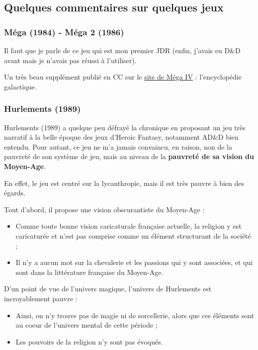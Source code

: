 \documentclass[a4paper, 11pt, twoside]{article}
\begin{document}
\subsection{Quelques commentaires sur quelques jeux}
\label{sec:orge708b2d}
\subsubsection{Méga (1984) - Méga 2 (1986)}
\label{sec:org41e31c1}
Il faut que je parle de ce jeu qui est mon premier JDR (enfin, j'avais eu D\&D avant mais je n'avais pas réussi à l'utiliser).

Un très beau supplément publié en CC sur le \href{https://www.messagers-galactiques.com}{site de Méga IV} : l'encyclopédie galactique.

\subsubsection{Hurlements (1989)}
\label{sec:orgdacab94}

Hurlements (1989) a quelque peu défrayé la chronique en proposant un jeu très narratif à la belle époque des jeux d'Heroic Fantasy, notamment AD\&D bien entendu. Pour autant, ce jeu ne m'a jamais convaincu, en raison, non de la pauvreté de son système de jeu, mais au niveau de la \textbf{pauvreté de sa vision du Moyen-Age}.

En effet, le jeu est centré sur la lycanthropie, mais il est très pauvre à bien des égards.

Tout d'abord, il propose une vision obscurantiste du Moyen-Age :
\begin{itemize}
\item Comme toute bonne vision caricaturale française actuelle, la religion y est caricaturée et n'est pas comprise comme un élément structurant de la société ;
\item Il n'y a aucun mot sur la chevalerie et les passions qui y sont associées, et qui sont dans la littérature française du Moyen-Age.
\end{itemize}

D'un point de vue de l'univers magique, l'univers de Hurlements est incroyablement pauvre :
\begin{itemize}
\item Ainsi, on n'y trouve pas de magie ni de sorcellerie, alors que ces éléments sont au coeur de l'univers mental de cette période ;
\item Les pouvoirs de la religion n'y sont pas évoqués.
\end{itemize}
\end{document}
